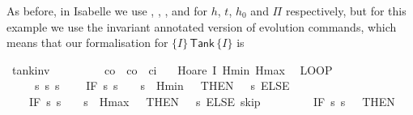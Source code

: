 \documentclass[envcountsame,envcountsect]{llncs}
\begin{document}
\begin{example}
As before, in Isabelle we use , , , and  for $h$, $t$, $h_0$ and $\Pi$ respectively, but for this example we use the invariant annotated version of evolution commands, which means that our formalisation for $\{I\}\, \mathsf{Tank}\, \{I\}$ is
\begin{isabellebody}
\isanewline
{}\isamarkupfalse%
\ tank{\isacharunderscore}inv{\isacharcolon}\isanewline
\ \ \ {\isachardoublequoteopen}{}\ {\isasymle}\ {\isasymtau}{\isachardoublequoteclose}\ \ {\isachardoublequoteopen}{}\ {\isacharless}\ c\isactrlsub o{\isachardoublequoteclose}\ \ {\isachardoublequoteopen}c\isactrlsub o\ {\isacharless}\ c\isactrlsub i{\isachardoublequoteclose}\isanewline
\ \ \ {\isachardoublequoteopen}Hoare\ {\isasymlceil}I\ Hmin\ Hmax{\isasymrceil}\isanewline
\ \ {\isacharparenleft}LOOP\ \isanewline
\ \ \ \ %
\isanewline
\ \ \ \ {\isacharparenleft}{\isacharparenleft}{}\ {\isacharcolon}{\isacharcolon}{\isacharequal}{\isacharparenleft}{\isasymlambda}s{\isachardot}{}{\isacharparenright}{\isacharparenright}{\isacharsemicolon}{\isacharparenleft}{}\ {\isacharcolon}{\isacharcolon}{\isacharequal}{\isacharparenleft}{\isasymlambda}s{\isachardot}\ s{\isachardollar}{}{\isacharparenright}{\isacharparenright}{\isacharsemicolon}\isanewline
\ \ \ \ {\isacharparenleft}IF\ {\isacharparenleft}{\isasymlambda}s{\isachardot}\ s{\isachardollar}{}\ {\isacharequal}\ {}\ {\isasymand}\ s{\isachardollar}{}\ {\isasymle}\ Hmin\ {\isacharplus}\ {}{\isacharparenright}\ THEN\ {\isacharparenleft}{}\ {\isacharcolon}{\isacharcolon}{\isacharequal}\ {\isacharparenleft}{\isasymlambda}s{\isachardot}{}{\isacharparenright}{\isacharparenright}\ ELSE\ \isanewline
\ \ \ \ {\isacharparenleft}IF\ {\isacharparenleft}{\isasymlambda}s{\isachardot}\ s{\isachardollar}{}\ {\isacharequal}\ {}\ {\isasymand}\ s{\isachardollar}{}\ {\isasymge}\ Hmax\ {\isacharminus}\ {}{\isacharparenright}\ THEN\ {\isacharparenleft}{}\ {\isacharcolon}{\isacharcolon}{\isacharequal}\ {\isacharparenleft}{\isasymlambda}s{\isachardot}{}{\isacharparenright}{\isacharparenright}\ ELSE\ skip{\isacharparenright}{\isacharparenright}{\isacharsemicolon}\isanewline
\ \ \ \ %
\isanewline
\ \ \ \ {\isacharparenleft}IF\ {\isacharparenleft}{\isasymlambda}s{\isachardot}\ s{\isachardollar}{}\ {\isacharequal}\ {}{\isacharparenright}\ THEN\ \isanewline

\end{isabellebody}
\end{example}
\end{document}

